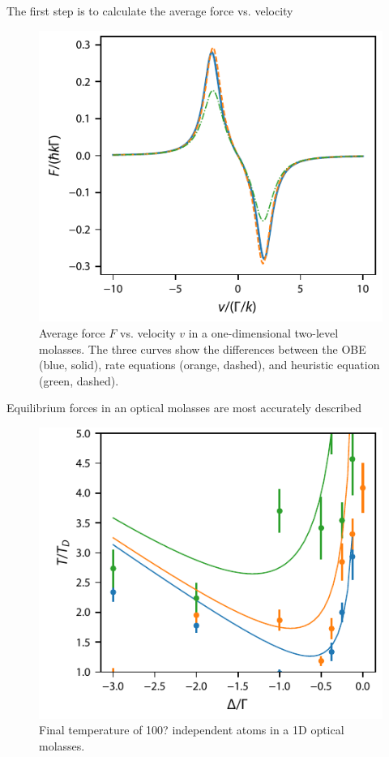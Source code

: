 \documentclass[final,5p,times,twocolumn]{elsarticle}
\begin{document}
The first step is to calculate the average force vs. velocity
\begin{figure}
	\center
	\includegraphics{figs/two_level_molasses_forces.pdf}
	\caption{\label{fig:two_level_molasses_forces} Average force $F$ vs. velocity $v$ in a one-dimensional two-level molasses.  The three curves show the differences between the OBE (blue, solid), rate equations (orange, dashed), and heuristic equation (green, dashed).}
\end{figure}

Equilibrium forces in an optical molasses are most accurately described 

\begin{figure}
	\center
	\includegraphics{figs/final_temperature_two_level_1D_molasses_rate_eqn.pdf}
	\caption{\label{fig:doppler_limit} Final temperature of 100? independent atoms in a 1D optical molasses.}
\end{figure}
\end{document}
